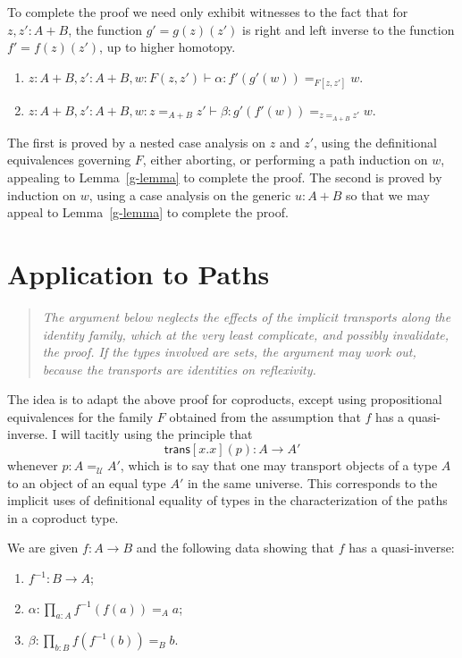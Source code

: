 \documentclass{article}
\newcommand{\sumty}[2]{{#1}+{#2}}
\newcommand{\idty}[3]{{#2}\mathbin{=_{#1}}{#3}}
\newcommand{\family}[2]{{#1}.{#2}}
\newcommand{\prodty}[3]{\prod_{{#1}{:}{#2}}{#3}}
\newcommand{\app}[2]{{#1}({#2})}
\newcommand{\univty}{\mathcal{U}}
\newcommand{\iv}[1]{#1^{-1}}
\newcommand{\transport}[2]{\mathsf{trans}[#1](#2)}
\begin{document}
To complete the proof we need only exhibit witnesses to the fact that for $z,z':\sumty{A}{B}$, the function  $g'=\app{\app{g}{z}}{z'}$ is right and left inverse to the function $f'=\app{\app{f}{z}}{z'}$, up to higher homotopy.
\begin{enumerate}
\item $z:\sumty{A}{B},z':\sumty{A}{B},w:F(z,z')\vdash \alpha : \idty{F[z,z']}{\app{f'}{\app{g'}{w}}}{w}$.
\item $z:\sumty{A}{B},z':\sumty{A}{B},w:\idty{\sumty{A}{B}}{z}{z'}\vdash \beta : \idty{\idty{\sumty{A}{B}}{z}{z'}}{\app{g'}{\app{f'}{w}}}{w}$.
\end{enumerate}

The first is proved by a nested case analysis on $z$ and $z'$, using the definitional equivalences governing $F$, either aborting, or performing a path induction on $w$, appealing to Lemma~\ref{g-lemma} to complete the proof.  The second is proved by induction on $w$, using a case analysis on the generic $u:\sumty{A}{B}$ so that we may appeal to Lemma~\ref{g-lemma} to complete the proof.

\section{Application to Paths}

\begin{quote}
  \textit{The argument below neglects the effects of the implicit transports
    along the identity family, which at the very least complicate, and possibly
    invalidate, the proof.  If the types involved are sets, the argument may
    work out, because the transports are identities on reflexivity.}
\end{quote}

The idea is to adapt the above proof for coproducts, except using propositional
equivalences for the family $F$ obtained from the assumption that $f$ has a
quasi-inverse.  I will tacitly using the principle
that $$\transport{\family{x}{x}}{p}:A\to A'$$ whenever
$p:\idty{\univty}{A}{A'}$, which is to say that one may transport objects of a
type $A$ to an object of an equal type $A'$ in the same universe.  This
corresponds to the implicit uses of definitional equality of types in the
characterization of the paths in a coproduct type.

We are given $f:A\to B$ and the following data showing that $f$ has a quasi-inverse:
\begin{enumerate}
\item $\iv{f}:B\to A$;
\item $\alpha:\prodty{a}{A}{\idty{A}{\app{\iv{f}}{\app{f}{a}}}{a}}$;
\item $\beta:\prodty{b}{B}{\idty{B}{\app{f}{\app{\iv{f}}{b}}}{b}}$.
\end{enumerate}
\end{document}
